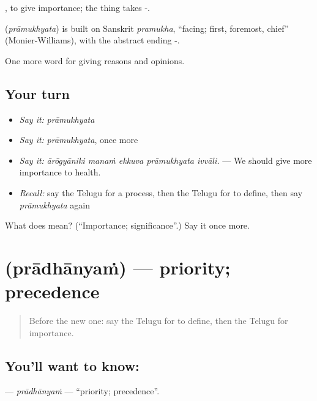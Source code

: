  , to give importance; the thing takes -.

\begin{cousinweb}
\textbf{} (\emph{prāmukhyata}) is built on Sanskrit \emph{pramukha}, \textquotedblleft{}facing; first, foremost, chief\textquotedblright{} (Monier-Williams), with the abstract ending -.
\end{cousinweb}

\begin{grammarlens}[title={What you've built}]
One more word for giving reasons and opinions.
\end{grammarlens}

\subsection*{Your turn}
\begin{itemize}
\raggedright
  \item \emph{Say it:} \emph{prāmukhyata}
  \item \emph{Say it:} \emph{prāmukhyata}, once more
  \item \emph{Say it:} \emph{ārōgyāniki manaṁ ekkuva prāmukhyata ivvāli.} — We should give more importance to health.
  \item \emph{Recall:} say the Telugu for a process, then the Telugu for to define, then say \emph{prāmukhyata} again
\end{itemize}

\begin{tcolorbox}[breakable,colback=teal!4,colframe=teal!35!black,title={Before you move on}]
What does  mean? (\textquotedblleft{}Importance; significance\textquotedblright{}.) Say it once more.
\end{tcolorbox}
\section[\texorpdfstring{\te{ప్రాధాన్యం} (prādhānyaṁ)}{ప్రాధాన్యం (prādhānyaṁ)}]{ (prādhānyaṁ) — priority; precedence}

\label{lesson:TE-C391-pradhanyam}



\begin{quote}
Before the new one: say the Telugu for to define, then the Telugu for importance.
\end{quote}

\subsection*{You'll want to know: }
\textbf{} — \emph{prādhānyaṁ} — \textquotedblleft{}priority; precedence\textquotedblright{}.

